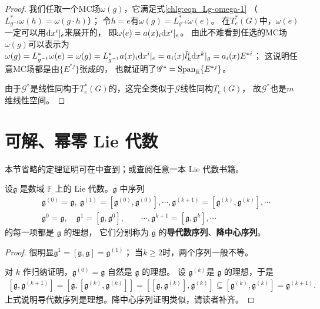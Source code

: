 \begin{proof}
    我们任取一个MC场$\omega(g)$，它满足式\eqref{chlg:eqn_Lg-omega-1}
    （$L_{g^{-1}}^* \omega(h)= \omega(g \cdot h)$）；
    令$h=e$有$\omega(g)=L_{g^{-1}}^* \omega(e) $。
    在$T_e^*(G)$中，$\omega(e)$一定可以用${\rm d}x^i|_{e}$来展开的，
    即$\omega(e)= a(x)_i{\rm d}x^i|_{e}$。
    由此不难看到任选的MC场$\omega(g)$可以表示为
    $\omega(g)=L_{g^{-1}}^* \omega(e)=\omega(g)=L_{g^{-1}}^* a(x)_i{\rm d}x^i|_{e}
    = a_i(x) \tilde{l}^i_k {\rm d}x^k |_{g}= a_i(x) E^{*i}$；
    这说明任意MC场都是由$\{E^{*j}\}$张成的，
    也就证明了$\mathscr{G}^*={\rm Span}_{\mathbb{R}}\{E^{*j}\}$。
    
    由于$\mathscr{G}^*$是线性同构于$T_e^*(G)$的，这完全类似于$\mathscr{G}$线性同构$T_e(G)$，
    故$\mathscr{G}^*$也是$m$维线性空间。
\end{proof}





\section{可解、幂零 Lie 代数}\label{chlg:sec_sn}

本节省略的定理证明可在\parencite[\S 4.1-\S 4.2]{huangxg-2024}中查到；或查阅任意一本 Lie 代数书籍。

\begin{proposition}
    设$\mathfrak{g}$ 是数域 $\mathbb{F}$ 上的 Lie 代数。$\mathfrak{g}$ 中序列 
    \begin{align*}
    &\mathfrak{g}^{(0)}=\mathfrak{g}, \ 
    \mathfrak{g}^{(1)}=\left[\mathfrak{g}^{(0)}, \mathfrak{g}^{(0)}\right],\cdots,
    \mathfrak{g}^{(k+1)}=\left[\mathfrak{g}^{(k)}, \mathfrak{g}^{(k)}\right],\cdots \\
    &\mathfrak{g}^0=\mathfrak{g}, \quad
    \mathfrak{g}^{1}=\left[\mathfrak{g}, \mathfrak{g}^{0}\right],  \qquad  \cdots,
    \mathfrak{g}^{k+1}=\left[\mathfrak{g}, \mathfrak{g}^k\right], \cdots    
    \end{align*}
    的每一项都是 $\mathfrak{g}$ 的理想，
    它们分别称为 $\mathfrak{g}$ 的\textbf{导代数序列}、\textbf{降中心序列}。
\end{proposition}
\begin{proof}
    很明显$\mathfrak{g}^{1}=\left[\mathfrak{g}, \mathfrak{g}\right]=\mathfrak{g}^{(1)}$；
    当$k\geqslant 2$时，两个序列一般不等。
    
    
    对 $k$ 作归纳证明，$\mathfrak{g}^{(0)}=\mathfrak{g}$ 自然是 $\mathfrak{g}$ 的理想。
    设 $\mathfrak{g}^{(k)}$是 $\mathfrak{g}$ 的理想，于是 
    \begin{align*}
        \left[\mathfrak{g}, \mathfrak{g}^{(k+1)}\right]=\left[\mathfrak{g},\left[\mathfrak{g}^{(k)}, \mathfrak{g}^{(k)}\right]\right]=\left[\left[\mathfrak{g}, \mathfrak{g}^{(k)}\right], \mathfrak{g}^{(k)}\right] \subseteq\left[\mathfrak{g}^{(k)}, \mathfrak{g}^{(k)}\right]=\mathfrak{g}^{(k+1)} .
    \end{align*}
    上式说明导代数序列是理想。降中心序列证明类似，请读者补齐。
\end{proof}


